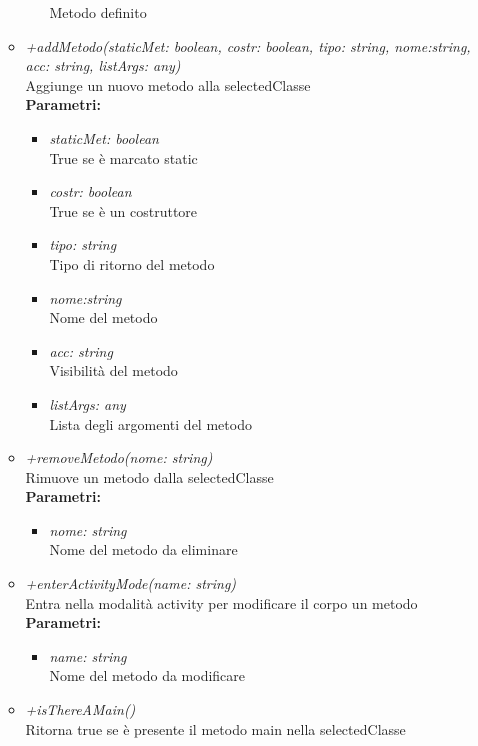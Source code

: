 \begin{itemize}
\begin{itemize}
\begin{itemize}
    			Metodo definito
    		\end{itemize}
    		\item \emph{+addMetodo(staticMet: boolean, costr: boolean, tipo: string, nome:string, acc: string, listArgs: any)}\\
    		Aggiunge un nuovo metodo alla selectedClasse\\
    		\textbf{Parametri:}
    		\begin{itemize}
    			\item \emph{staticMet: boolean}\\
    			True se è marcato static
    			\item \emph{costr: boolean}\\
    			True se è un costruttore
    			\item \emph{tipo: string}\\
    			Tipo di ritorno del metodo
    			\item \emph{nome:string}\\
    			Nome del metodo
    			\item \emph{acc: string}\\
    			Visibilità del metodo
    			\item \emph{listArgs: any}\\
    			Lista degli argomenti del metodo
    		\end{itemize}
    		\item \emph{+removeMetodo(nome: string)}\\
    		Rimuove un metodo dalla selectedClasse\\
    		\textbf{Parametri:}
    		\begin{itemize}
    			\item \emph{nome: string}\\
    			Nome del metodo da eliminare
    		\end{itemize}
    		\item \emph{+enterActivityMode(name: string)}\\
    		Entra nella modalità activity per modificare il corpo un metodo\\
    		\textbf{Parametri:}
    		\begin{itemize}
    			\item \emph{name: string}\\
    			Nome del metodo da modificare
    		\end{itemize}
    		\item \emph{+isThereAMain()}\\
    		Ritorna true se è presente il metodo main nella selectedClasse

\end{itemize}
\end{itemize}
